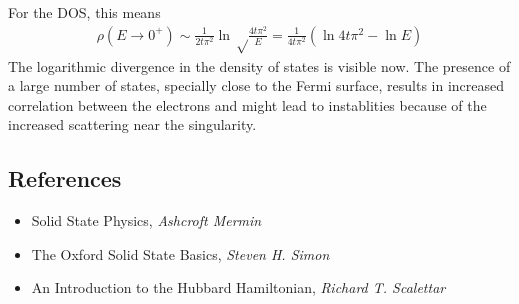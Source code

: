 \documentclass[12pt]{article}
\numberwithin{equation}{section}
\begin{document}
For the DOS, this means
\begin{equation}\begin{aligned}
	\rho(E \to 0^+) \sim \frac{1}{2t\pi^2} \ln \sqrt\frac{4t\pi^2}{E} = \frac{1}{4t\pi^2}\left(\ln 4t\pi^2 - \ln E\right) 
\end{aligned}\end{equation}
The logarithmic divergence in the density of states is visible now. The presence of a large number of states, specially close to the Fermi surface, results in increased correlation between the electrons and might lead to instablities because of the increased scattering near the singularity.

\newpage
\subsection*{References}
\begin{itemize}
	\item Solid State Physics, \textit{Ashcroft Mermin}
	\item The Oxford Solid State Basics, \textit{Steven H. Simon}
	\item An Introduction to the Hubbard Hamiltonian, \textit{Richard T. Scalettar}
\end{itemize}
\end{document}
